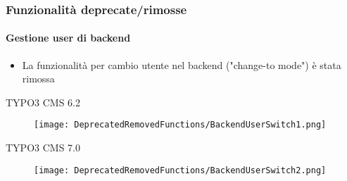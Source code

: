 
\begin{frame}[fragile]
	\frametitle{Funzionalità deprecate/rimosse}
	\framesubtitle{Gestione user di backend}

	\begin{itemize}
		\item La funzionalità per cambio utente nel backend ("change-to mode") è stata rimossa
	\end{itemize}

	\smaller\tabto{1cm}\begingroup\color{typo3red}TYPO3 CMS 6.2\endgroup\normalsize
	\begin{figure}\vspace{-0.4cm}
		\texttt{[image: DeprecatedRemovedFunctions/BackendUserSwitch1.png]}
	\end{figure}

	\smaller\tabto{1cm}\begingroup\color{typo3red}TYPO3 CMS 7.0\endgroup\normalsize
	\begin{figure}\vspace{-0.4cm}
		\texttt{[image: DeprecatedRemovedFunctions/BackendUserSwitch2.png]}
	\end{figure}

\end{frame}


